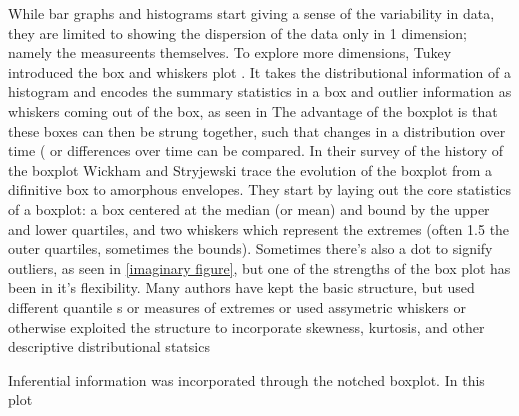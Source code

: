 While bar graphs and histograms start giving a sense of the variability in
data, they are limited to showing the dispersion of the data only in 1
dimension; namely the measureents themselves. To explore more dimensions,
Tukey introduced the box and whiskers plot \cite{Tukey1970, Tukey1977}. It
takes the distributional information of a histogram and encodes the summary
statistics in a box and outlier information as whiskers coming out of the box,
as seen in %
The advantage of the boxplot is that these boxes can then be strung together,
such that changes in a distribution over time (%
or differences over time can be compared. In their survey of the history of the
boxplot \cite{Wickham2011} Wickham and Stryjewski trace the evolution of the
boxplot from a difinitive box to amorphous envelopes.  They start by laying out
the core statistics of a boxplot: a box centered at the median (or mean) and
bound by the upper and lower quartiles, and two whiskers which represent the extremes
(often 1.5 the outer quartiles, sometimes the \alpha bounds). Sometimes there's
also a dot to signify outliers, as seen in \ref{imaginary figure}, but one of
the strengths of the box plot has been in it's flexibility. Many authors have
kept the basic structure, but used different quantile \cite{Hyndman}s or
measures of extremes \cite{Frigge, carter} or used assymetric whiskers \cite{Rousseuw}
or otherwise exploited the structure to incorporate skewness, kurtosis, and
other descriptive distributional statsics \cite{ Aslam, choon, Marmelejo}

Inferential information was incorporated through the notched boxplot. \cite{McGill} %
In this plot










